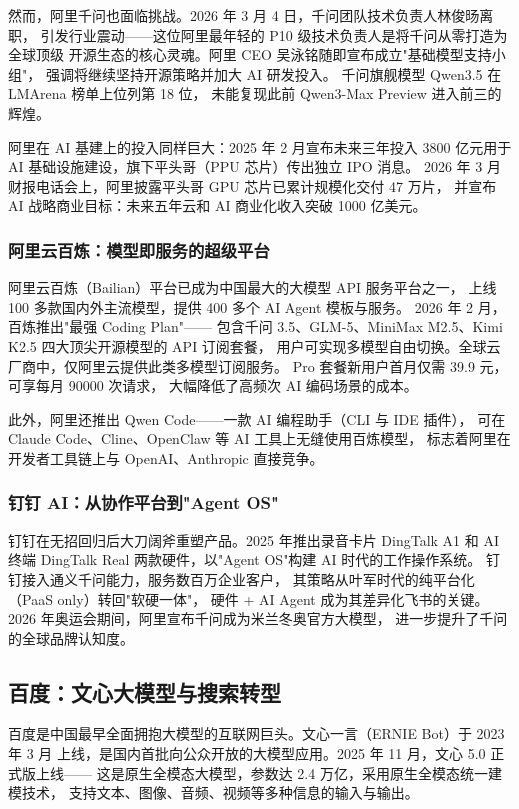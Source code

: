然而，阿里千问也面临挑战。2026 年 3 月 4 日，千问团队技术负责人林俊旸离职，
引发行业震动——这位阿里最年轻的 P10 级技术负责人是将千问从零打造为全球顶级
开源生态的核心灵魂。阿里 CEO 吴泳铭随即宣布成立"基础模型支持小组"，
强调将继续坚持开源策略并加大 AI 研发投入。
千问旗舰模型 Qwen3.5 在 LMArena 榜单上位列第 18 位，
未能复现此前 Qwen3-Max Preview 进入前三的辉煌。

阿里在 AI 基建上的投入同样巨大：2025 年 2 月宣布未来三年投入 3800 亿元用于
AI 基础设施建设，旗下平头哥（PPU 芯片）传出独立 IPO 消息。
2026 年 3 月财报电话会上，阿里披露平头哥 GPU 芯片已累计规模化交付 47 万片，
并宣布 AI 战略商业目标：未来五年云和 AI 商业化收入突破 1000 亿美元。

\subsubsection{阿里云百炼：模型即服务的超级平台}

阿里云百炼（Bailian）平台已成为中国最大的大模型 API 服务平台之一，
上线 100 多款国内外主流模型，提供 400 多个 AI Agent 模板与服务。
2026 年 2 月，百炼推出"最强 Coding Plan"——
包含千问 3.5、GLM-5、MiniMax M2.5、Kimi K2.5 四大顶尖开源模型的 API 订阅套餐，
用户可实现多模型自由切换。全球云厂商中，仅阿里云提供此类多模型订阅服务。
Pro 套餐新用户首月仅需 39.9 元，可享每月 90000 次请求，
大幅降低了高频次 AI 编码场景的成本。

此外，阿里还推出 Qwen Code——一款 AI 编程助手（CLI 与 IDE 插件），
可在 Claude Code、Cline、OpenClaw 等 AI 工具上无缝使用百炼模型，
标志着阿里在开发者工具链上与 OpenAI、Anthropic 直接竞争。

\subsubsection{钉钉 AI：从协作平台到"Agent OS"}

钉钉在无招回归后大刀阔斧重塑产品。2025 年推出录音卡片 DingTalk A1
和 AI 终端 DingTalk Real 两款硬件，以"Agent OS"构建 AI 时代的工作操作系统。
钉钉接入通义千问能力，服务数百万企业客户，
其策略从叶军时代的纯平台化（PaaS only）转回"软硬一体"，
硬件 + AI Agent 成为其差异化飞书的关键。
2026 年奥运会期间，阿里宣布千问成为米兰冬奥官方大模型，
进一步提升了千问的全球品牌认知度。

\subsection{百度：文心大模型与搜索转型}
\label{subsec:china-baidu}

百度是中国最早全面拥抱大模型的互联网巨头。文心一言（ERNIE Bot）于 2023 年 3 月
上线，是国内首批向公众开放的大模型应用。2025 年 11 月，文心 5.0 正式版上线——
这是原生全模态大模型，参数达 2.4 万亿，采用原生全模态统一建模技术，
支持文本、图像、音频、视频等多种信息的输入与输出。

